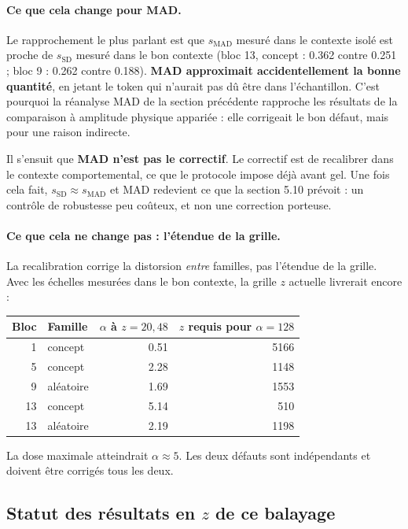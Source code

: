 \documentclass[11pt,a4paper]{article}
\newcommand{\ssd}{s_{\mathrm{SD}}}
\newcommand{\smad}{s_{\mathrm{MAD}}}
\begin{document}
\paragraph{Ce que cela change pour MAD.} Le rapprochement le plus parlant est que
$\smad$ mesuré dans le contexte isolé est proche de $\ssd$ mesuré dans le bon contexte
(bloc 13, concept : \num{0.362} contre \num{0.251} ; bloc 9 : \num{0.262} contre
\num{0.188}). \textbf{MAD approximait accidentellement la bonne quantité}, en jetant le
token qui n'aurait pas dû être dans l'échantillon. C'est pourquoi la réanalyse MAD de la
section précédente rapproche les résultats de la comparaison à amplitude physique
appariée : elle corrigeait le bon défaut, mais pour une raison indirecte.

Il s'ensuit que \textbf{MAD n'est pas le correctif}. Le correctif est de recalibrer dans
le contexte comportemental, ce que le protocole impose déjà avant gel. Une fois cela
fait, $\ssd \approx \smad$ et MAD redevient ce que la section 5.10 prévoit : un contrôle
de robustesse peu coûteux, et non une correction porteuse.

\paragraph{Ce que cela ne change pas : l'étendue de la grille.} La recalibration corrige
la distorsion \emph{entre} familles, pas l'étendue de la grille. Avec les échelles
mesurées dans le bon contexte, la grille $z$ actuelle livrerait encore :

\begin{center}
\begin{tabular}{rlrr}
\toprule
Bloc & Famille & $\alpha$ à $z=20{,}48$ & $z$ requis pour $\alpha=128$ \\
\midrule
1  & concept   & \num{0.51} & \num{5166} \\
5  & concept   & \num{2.28} & \num{1148} \\
9  & aléatoire & \num{1.69} & \num{1553} \\
13 & concept   & \num{5.14} & \num{510} \\
13 & aléatoire & \num{2.19} & \num{1198} \\
\bottomrule
\end{tabular}
\end{center}

\noindent
La dose maximale atteindrait $\alpha \approx 5$. Les deux défauts sont indépendants et
doivent être corrigés tous les deux.

\subsection{Statut des résultats en \texorpdfstring{$z$}{z} de ce balayage}
\label{sec:portee}
\end{document}
